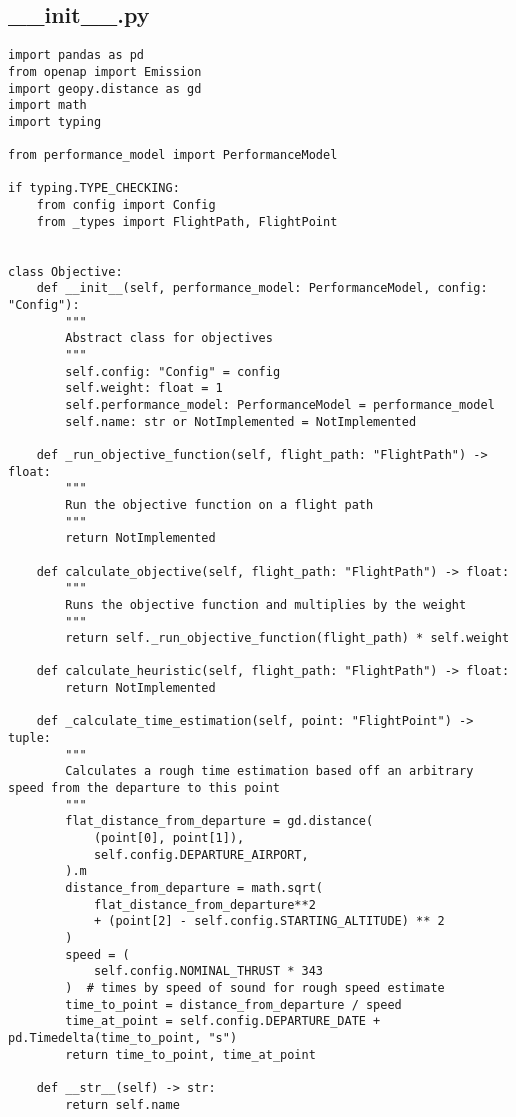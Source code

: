 \subsection{__init__.py}
\begin{verbatim}
import pandas as pd
from openap import Emission
import geopy.distance as gd
import math
import typing

from performance_model import PerformanceModel

if typing.TYPE_CHECKING:
    from config import Config
    from _types import FlightPath, FlightPoint


class Objective:
    def __init__(self, performance_model: PerformanceModel, config: "Config"):
        """
        Abstract class for objectives
        """
        self.config: "Config" = config
        self.weight: float = 1
        self.performance_model: PerformanceModel = performance_model
        self.name: str or NotImplemented = NotImplemented

    def _run_objective_function(self, flight_path: "FlightPath") -> float:
        """
        Run the objective function on a flight path
        """
        return NotImplemented

    def calculate_objective(self, flight_path: "FlightPath") -> float:
        """
        Runs the objective function and multiplies by the weight
        """
        return self._run_objective_function(flight_path) * self.weight

    def calculate_heuristic(self, flight_path: "FlightPath") -> float:
        return NotImplemented

    def _calculate_time_estimation(self, point: "FlightPoint") -> tuple:
        """
        Calculates a rough time estimation based off an arbitrary speed from the departure to this point
        """
        flat_distance_from_departure = gd.distance(
            (point[0], point[1]),
            self.config.DEPARTURE_AIRPORT,
        ).m
        distance_from_departure = math.sqrt(
            flat_distance_from_departure**2
            + (point[2] - self.config.STARTING_ALTITUDE) ** 2
        )
        speed = (
            self.config.NOMINAL_THRUST * 343
        )  # times by speed of sound for rough speed estimate
        time_to_point = distance_from_departure / speed
        time_at_point = self.config.DEPARTURE_DATE + pd.Timedelta(time_to_point, "s")
        return time_to_point, time_at_point

    def __str__(self) -> str:
        return self.name


\end{verbatim}
